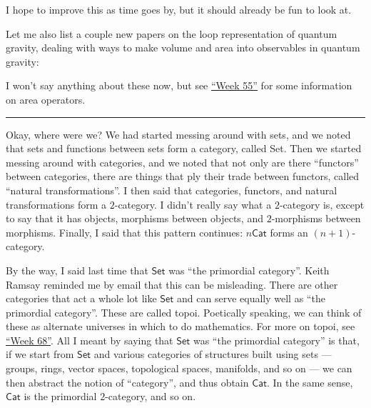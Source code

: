 \documentclass{article}
\renewcommand{\texttt}[1]{%
  \begingroup
  \ttfamily
  \begingroup\lccode`~=`/\lowercase{\endgroup\def~}{/\discretionary{}{}{}}%
  \begingroup\lccode`~=`[\lowercase{\endgroup\def~}{[\discretionary{}{}{}}%
  \begingroup\lccode`~=`.\lowercase{\endgroup\def~}{.\discretionary{}{}{}}%
  \catcode`/=\active\catcode`[=\active\catcode`.=\active
  \scantokens{#1\noexpand}%
  \endgroup
}
\begin{document}
I hope to improve this as time goes by, but it should already be fun to
look at.

Let me also list a couple new papers on the loop representation of
quantum gravity, dealing with ways to make volume and area into
observables in quantum gravity:


I won't say anything about these now, but see
\protect\hyperlink{week55}{``Week 55''} for some information on area
operators.

\begin{center}\rule{0.5\linewidth}{0.5pt}\end{center}

Okay, where were we? We had started messing around with sets, and we
noted that sets and functions between sets form a category, called Set.
Then we started messing around with categories, and we noted that not
only are there ``functors'' between categories, there are things that
ply their trade between functors, called ``natural transformations''. I
then said that categories, functors, and natural transformations form a
\(2\)-category. I didn't really say what a \(2\)-category is, except to
say that it has objects, morphisms between objects, and \(2\)-morphisms
between morphisms. Finally, I said that this pattern continues:
\(n\mathsf{Cat}\) forms an \((n+1)\)-category.

By the way, I said last time that \(\mathsf{Set}\) was ``the primordial
category''. Keith Ramsay reminded me by email that this can be
misleading. There are other categories that act a whole lot like
\(\mathsf{Set}\) and can serve equally well as ``the primordial
category''. These are called topoi. Poetically speaking, we can think of
these as alternate universes in which to do mathematics. For more on
topoi, see \protect\hyperlink{week68}{``Week 68''}. All I meant by
saying that \(\mathsf{Set}\) was ``the primordial category'' is that, if
we start from \(\mathsf{Set}\) and various categories of structures
built using sets --- groups, rings, vector spaces, topological spaces,
manifolds, and so on --- we can then abstract the notion of
``category'', and thus obtain \(\mathsf{Cat}\). In the same sense,
\(\mathsf{Cat}\) is the primordial \(2\)-category, and so on.
\end{document}

